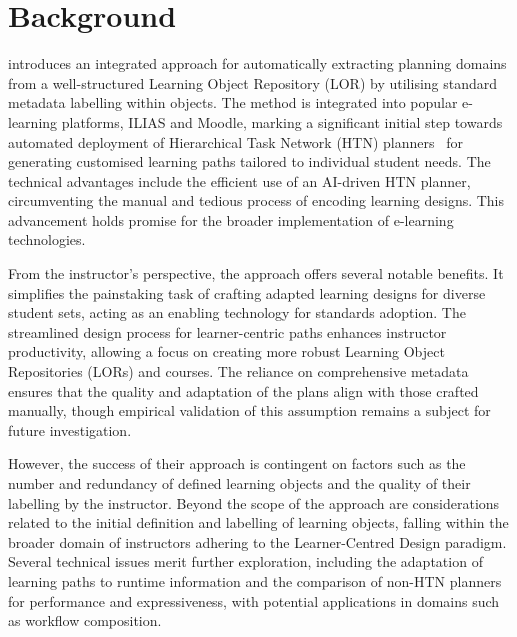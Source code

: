 \section{Background}
\citet{Castillo2009} introduces an integrated approach for automatically extracting planning domains from a well-structured Learning Object Repository (LOR) by utilising standard metadata labelling within objects. The method is integrated into popular e-learning platforms, ILIAS and Moodle, marking a significant initial step towards automated deployment of Hierarchical Task Network (HTN) planners~\cite{georgievski2014overview} for generating customised learning paths tailored to individual student needs. The technical advantages include the efficient use of an AI-driven HTN planner, circumventing the manual and tedious process of encoding learning designs. This advancement holds promise for the broader implementation of e-learning technologies.

From the instructor's perspective, the approach offers several notable benefits. It simplifies the painstaking task of crafting adapted learning designs for diverse student sets, acting as an enabling technology for standards adoption. The streamlined design process for learner-centric paths enhances instructor productivity, allowing a focus on creating more robust Learning Object Repositories (LORs) and courses. The reliance on comprehensive metadata ensures that the quality and adaptation of the plans align with those crafted manually, though empirical validation of this assumption remains a subject for future investigation.

However, the success of their approach is contingent on factors such as the number and redundancy of defined learning objects and the quality of their labelling by the instructor. Beyond the scope of the approach are considerations related to the initial definition and labelling of learning objects, falling within the broader domain of instructors adhering to the Learner-Centred Design paradigm. Several technical issues merit further exploration, including the adaptation of learning paths to runtime information and the comparison of non-HTN planners for performance and expressiveness, with potential applications in domains such as workflow composition.


